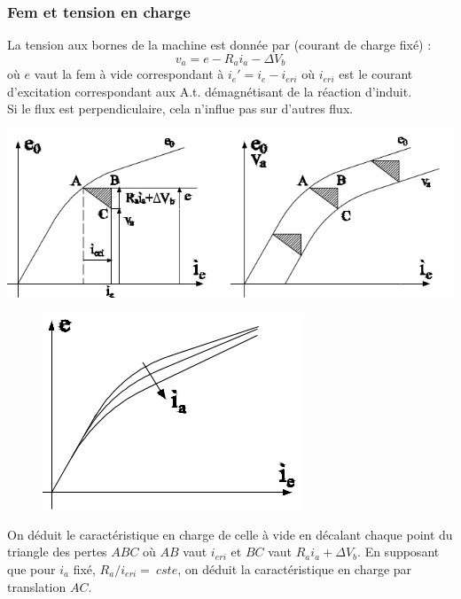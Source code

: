		
		\subsubsection{Fem et tension en charge}
		La tension aux bornes de la machine est donnée par (courant de charge fixé) :
		\begin{equation}
		v_a = e - R_ai_a - \Delta V_b
		\end{equation}
		où $e$ vaut la fem à vide correspondant à $i_e' = i_e-i_{eri}$ où $i_{eri}$ 
		est le courant d’excitation correspondant aux A.t. démagnétisant de la réaction 
		d'induit.\\
		\danger Si le flux est perpendiculaire, cela n'influe pas sur d'autres flux.\\

		\begin{center}
		\includegraphics[scale=0.43]{ch4/image19.png}
		\end{center}		
		
		\begin{figure}
		\includegraphics[scale=0.34]{ch4/image20.png}
		\end{figure}
		On déduit le caractéristique en charge de celle à vide en décalant chaque 
		point du triangle des pertes $ABC$ où $AB$ vaut $i_{eri}$ et $BC$ vaut 
		$R_ai_a + \Delta V_b$. En supposant que pour $i_a$ fixé, $R_a/i_{eri} =\ cste$, 
		on déduit la caractéristique en charge par translation $AC$.\\
				
